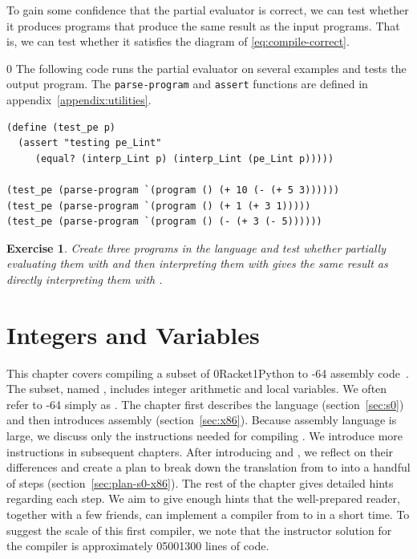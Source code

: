 \documentclass[7x10]{TimesAPriori_MIT}%
\def\racketEd{0}
\def\pythonEd{1}
\def\edition{1}
\newcommand{\racket}[1]{{\if\edition\racketEd{#1}\fi}}
\newcommand{\pythonColor}[0]{}
\newcommand{\python}[1]{{\if\edition\pythonEd\pythonColor #1\fi}}
\newtheorem{exercise}[theorem]{Exercise}
\numberwithin{theorem}{chapter}
\numberwithin{definition}{chapter}
\numberwithin{equation}{chapter}
\begin{document}
To gain some confidence that the partial evaluator is correct, we can
test whether it produces programs that produce the same result as the
input programs. That is, we can test whether it satisfies the diagram
of \eqref{eq:compile-correct}.
%
{\if\edition\racketEd
The following code runs the partial evaluator on several examples and
tests the output program.  The \texttt{parse-program} and
\texttt{assert} functions are defined in
appendix~\ref{appendix:utilities}.\\
\begin{minipage}{1.0\textwidth}
\begin{lstlisting}
(define (test_pe p)
  (assert "testing pe_Lint"
     (equal? (interp_Lint p) (interp_Lint (pe_Lint p)))))

(test_pe (parse-program `(program () (+ 10 (- (+ 5 3))))))
(test_pe (parse-program `(program () (+ 1 (+ 3 1)))))
(test_pe (parse-program `(program () (- (+ 3 (- 5))))))
\end{lstlisting}
\end{minipage}
\fi}

\begin{exercise}\normalfont\normalsize
  Create three programs in the \LangInt{} language and test whether
  partially evaluating them with  and then
  interpreting them with  gives the same result
  as directly interpreting them with .
\end{exercise}


\chapter{Integers and Variables}
\label{ch:Lvar}
\setcounter{footnote}{0}

This chapter covers compiling a subset of
\racket{Racket}\python{Python} to {\ArchName}-64 assembly
code~\citep{Intel:2015aa}. The subset, named \LangVar{}, includes
integer arithmetic and local variables.  We often refer to {\ArchName}-64
simply as {\ArchName}.  The chapter first describes the \LangVar{} language
(section~\ref{sec:s0}) and then introduces {\ArchName} assembly
(section~\ref{sec:x86}). Because {\ArchName} assembly language is large, we
discuss only the instructions needed for compiling \LangVar{}. We
introduce more {\ArchName} instructions in subsequent chapters.  After
introducing \LangVar{} and {\ArchName}, we reflect on their differences and
create a plan to break down the translation from \LangVar{} to {\ArchName}
into a handful of steps (section~\ref{sec:plan-s0-x86}).  The rest of
the chapter gives detailed hints regarding each step.  We aim to give
enough hints that the well-prepared reader, together with a few
friends, can implement a compiler from \LangVar{} to {\ArchName} in a short
time.  To suggest the scale of this first compiler, we note that the
instructor solution for the \LangVar{} compiler is approximately
\racket{500}\python{300} lines of code.
\end{document}
